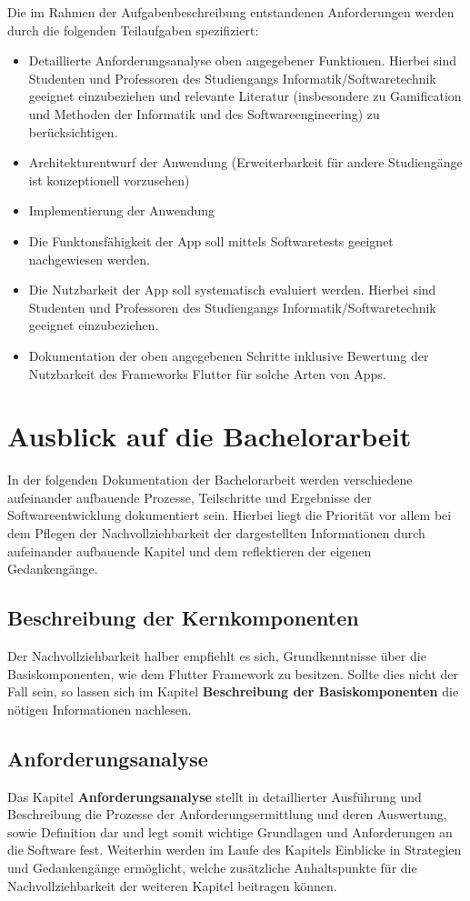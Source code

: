 \documentclass{scrreprt}
\begin{document}
Die im Rahmen der Aufgabenbeschreibung entstandenen Anforderungen werden durch die folgenden Teilaufgaben spezifiziert:
\begin{itemize}
\item Detaillierte Anforderungsanalyse oben angegebener Funktionen. Hierbei sind Studenten und Professoren des Studiengangs Informatik/Softwaretechnik geeignet einzubeziehen und relevante Literatur (insbesondere zu Gamification und Methoden der Informatik und des Softwareengineering) zu berücksichtigen.
\item Architekturentwurf der Anwendung (Erweiterbarkeit für andere Studiengänge ist konzeptionell vorzusehen)
\item Implementierung der Anwendung
\item Die Funktonsfähigkeit der App soll mittels Softwaretests geeignet nachgewiesen werden.
\item Die Nutzbarkeit der App soll systematisch evaluiert werden. Hierbei sind Studenten und Professoren des Studiengangs Informatik/Softwaretechnik geeignet einzubeziehen.
\item Dokumentation der oben angegebenen Schritte inklusive Bewertung der Nutzbarkeit des Frameworks Flutter für solche Arten von Apps.
\end{itemize}

\section{Ausblick auf die Bachelorarbeit}
In der folgenden Dokumentation der Bachelorarbeit werden verschiedene aufeinander aufbauende Prozesse, Teilschritte und Ergebnisse der Softwareentwicklung dokumentiert sein. Hierbei liegt die Priorität vor allem bei dem Pflegen der Nachvollziehbarkeit der dargestellten Informationen durch aufeinander aufbauende Kapitel und dem reflektieren der eigenen Gedankengänge.

\subsection{Beschreibung der Kernkomponenten}
Der Nachvollziehbarkeit halber empfiehlt es sich, Grundkenntnisse über die Basiskomponenten, wie dem Flutter Framework zu besitzen. Sollte dies nicht der Fall sein, so lassen sich im Kapitel \textbf{Beschreibung der Basiskomponenten} die nötigen Informationen nachlesen.

\subsection{Anforderungsanalyse}
Das Kapitel \textbf{Anforderungsanalyse} stellt in detaillierter Ausführung und Beschreibung die Prozesse der Anforderungsermittlung und deren Auswertung, sowie Definition dar und legt somit wichtige Grundlagen und Anforderungen an die Software fest. Weiterhin werden im Laufe des Kapitels Einblicke in Strategien und Gedankengänge ermöglicht, welche zusätzliche Anhaltspunkte für die Nachvollziehbarkeit der weiteren Kapitel beitragen können.
\end{document}
